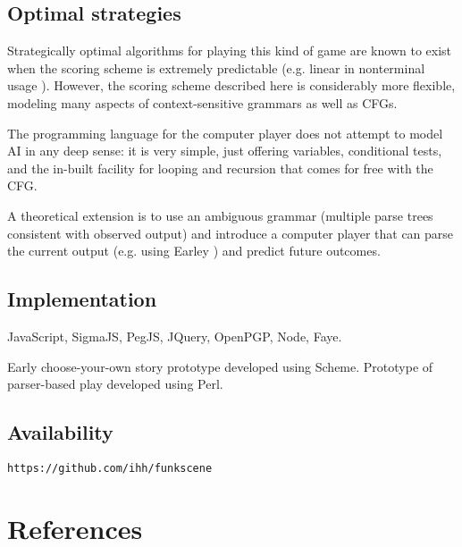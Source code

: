 \documentclass{acm_proc_article-sp}
\begin{document}
\subsection{Optimal strategies}

Strategically optimal algorithms for playing this kind of game are known to exist when the scoring scheme is extremely predictable (e.g. linear in nonterminal usage \cite{DBLP:conf/icalp/EtessamiWY08}).
However, the scoring scheme described here is considerably more flexible, modeling many aspects of context-sensitive grammars as well as CFGs.

The programming language for the computer player does not attempt to model AI in any deep sense:
it is very simple, just offering variables, conditional tests, and the in-built facility for looping and recursion that comes for free with the CFG.

A theoretical extension is to use an ambiguous grammar (multiple parse trees consistent with observed output)
and introduce a computer player that can parse the current output (e.g. using Earley \cite{Stolcke}) and predict future outcomes.

\subsection{Implementation}

JavaScript, SigmaJS, PegJS, JQuery, OpenPGP, Node, Faye.

Early choose-your-own story prototype developed using Scheme.
Prototype of parser-based play developed using Perl.


\subsection{Availability}

{\tt https://github.com/ihh/funkscene}

\section{References}




\balancecolumns
\end{document}
